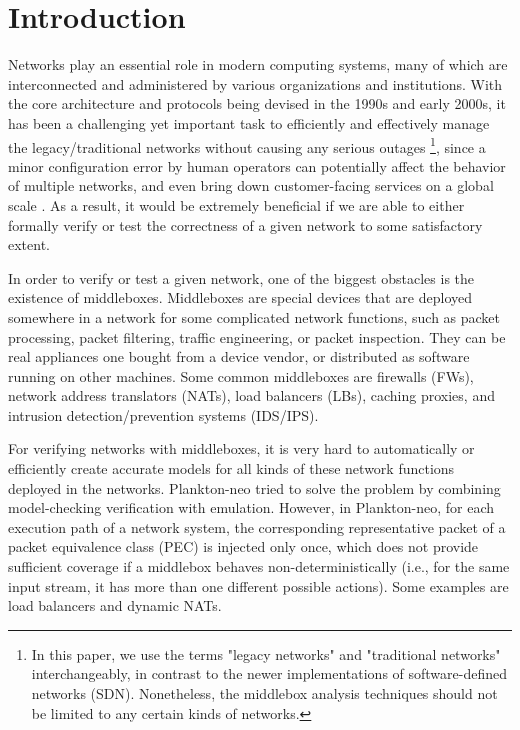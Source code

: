 \section{Introduction}

Networks play an essential role in modern computing systems, many of which are
interconnected and administered by various organizations and institutions. With
the core architecture and protocols being devised in the 1990s and early 2000s,
it has been a challenging yet important task to efficiently and effectively
manage the legacy/traditional networks without causing any serious outages
\footnote{In this paper, we use the terms "legacy networks" and "traditional
networks" interchangeably, in contrast to the newer implementations of
software-defined networks (SDN). Nonetheless, the middlebox analysis techniques
should not be limited to any certain kinds of networks.}, since a minor
configuration error by human operators can potentially affect the behavior of
multiple networks, and even bring down customer-facing services on a global
scale \cite{2017-Newton,2018-Speed}. As a result, it would be extremely
beneficial if we are able to either formally verify or test the correctness of a
given network to some satisfactory extent.

In order to verify or test a given network, one of the biggest obstacles is the
existence of middleboxes. Middleboxes are special devices that are deployed
somewhere in a network for some complicated network functions, such as packet
processing, packet filtering, traffic engineering, or packet inspection. They
can be real appliances one bought from a device vendor, or distributed as
software running on other machines. Some common middleboxes are firewalls (FWs),
network address translators (NATs), load balancers (LBs), caching proxies, and
intrusion detection/prevention systems (IDS/IPS).

For verifying networks with middleboxes, it is very hard to automatically or
efficiently create accurate models for all kinds of these network functions
deployed in the networks. Plankton-neo \cite{2018-PrabhuEtAl} tried to solve the
problem by combining model-checking verification with emulation. However, in
Plankton-neo, for each execution path of a network system, the corresponding
representative packet of a packet equivalence class (PEC) is injected only once,
which does not provide sufficient coverage if a middlebox behaves
non-deterministically (i.e., for the same input stream, it has more than one
different possible actions). Some examples are load balancers and dynamic NATs.

